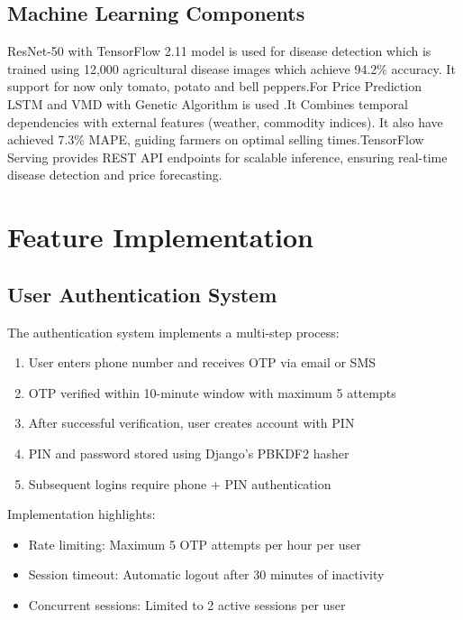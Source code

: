 \documentclass[12pt,a4paper]{report}
\begin{document}
\subsection{Machine Learning Components}

	ResNet-50 with TensorFlow 2.11 model is used for disease detection which is trained using 12,000 agricultural disease images which achieve 94.2\% accuracy. It support for now only tomato, potato and bell peppers.For Price Prediction LSTM and VMD with Genetic Algorithm is used .It Combines temporal dependencies with external features (weather, commodity indices). It also have achieved 7.3\% MAPE, guiding farmers on optimal selling times.TensorFlow Serving provides REST API endpoints for scalable inference, ensuring real-time disease detection and price forecasting.


\section{Feature Implementation}

\subsection{User Authentication System}

The authentication system implements a multi-step process:

\begin{enumerate}
    \item User enters phone number and receives OTP via email or SMS
    \item OTP verified within 10-minute window with maximum 5 attempts
    \item After successful verification, user creates account with PIN
    \item PIN and password stored using Django's PBKDF2 hasher
    \item Subsequent logins require phone + PIN authentication
\end{enumerate}

Implementation highlights:
\begin{itemize}
    \item Rate limiting: Maximum 5 OTP attempts per hour per user
    \item Session timeout: Automatic logout after 30 minutes of inactivity
    \item Concurrent sessions: Limited to 2 active sessions per user
\end{itemize}
\end{document}
